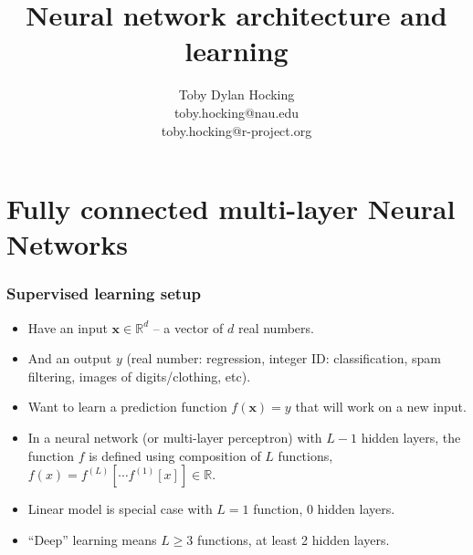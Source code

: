 \documentclass{beamer}
\begin{document}
\title{Neural network architecture and learning}

\author{
  Toby Dylan Hocking\\
  toby.hocking@nau.edu\\
  toby.hocking@r-project.org\\
}

\maketitle


\section{Fully connected multi-layer Neural Networks}

\begin{frame}
  \frametitle{Supervised learning setup}
  \begin{itemize}
  \item Have an input $\mathbf x\in\mathbb R^d$ -- a vector of $d$
    real numbers.
  \item And an output $y$ (real number: regression, integer ID:
    classification, spam filtering, images of digits/clothing, etc).
  \item Want to learn a prediction function $f(\mathbf x) = y$ that
    will work on a new input.
  \item In a neural network (or multi-layer perceptron) with $L-1$
    hidden layers, the function $f$ is defined using composition of
    $L$ functions, $f(x)=f^{(L)}[\cdots f^{(1)}[x] ]\in\mathbb R$.
  \item Linear model is special case with $L=1$ function, 0 hidden
    layers.
  \item ``Deep'' learning means $L\geq 3$ functions, at least 2 hidden
    layers.
  \end{itemize}
\end{frame}
\end{document}
